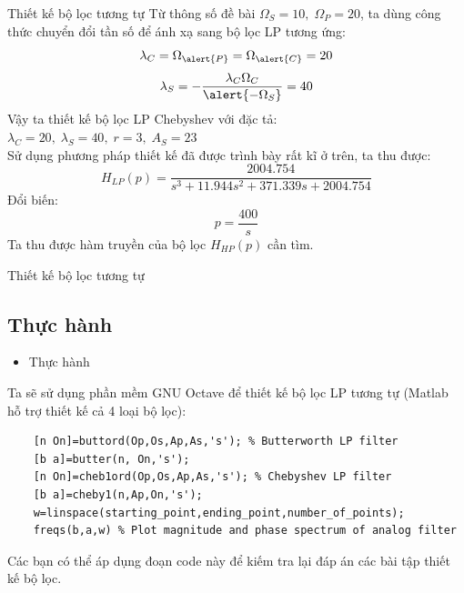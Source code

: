 \documentclass[8pt]{beamer}
\begin{document}
\begin{frame}{Thiết kế bộ lọc tương tự}
Từ thông số đề bài $\Omega_{S}=10,\;\Omega_{P}=20$, ta dùng công thức chuyển đổi tần số để ánh xạ sang bộ lọc LP tương ứng:
$$\lambda_{C}=\Omega_{\alert{P}}=\Omega_{\alert{C}}=20$$
$$\lambda_{S}=-\frac{\lambda_{C}\Omega_{C}}{\alert{-\Omega_{S}}}=40$$
Vậy ta thiết kế bộ lọc LP Chebyshev với đặc tả: $\lambda_{C}=20,\;\lambda_{S}=40,\;r=3,\;A_{S}=23$
\\ Sử dụng phương pháp thiết kế đã được trình bày rất kĩ ở trên, ta thu được:
$$H_{LP}(p)=\frac{2004.754}{s^3+11.944s^2+371.339s+2004.754}$$
Đổi biến: $$p=\frac{400}{s}$$
Ta thu được hàm truyền của bộ lọc $H_{HP}(p)$ cần tìm.
\end{frame}
\begin{frame}[fragile]{Thiết kế bộ lọc tương tự}
\subsection{Thực hành}
\begin{itemize}
	\item Thực hành
\end{itemize}
Ta sẽ sử dụng phần mềm GNU Octave để thiết kế bộ lọc LP tương tự (Matlab hỗ trợ thiết kế cả 4 loại bộ lọc):
\begin{verbatim}
	[n On]=buttord(Op,Os,Ap,As,'s'); % Butterworth LP filter
	[b a]=butter(n, On,'s');
	[n On]=cheb1ord(Op,Os,Ap,As,'s'); % Chebyshev LP filter
	[b a]=cheby1(n,Ap,On,'s'); 
	w=linspace(starting_point,ending_point,number_of_points);
	freqs(b,a,w) % Plot magnitude and phase spectrum of analog filter
\end{verbatim}
Các bạn có thể áp dụng đoạn code này để kiếm tra lại đáp án các bài tập thiết kế bộ lọc.
\end{frame}
\end{document}
